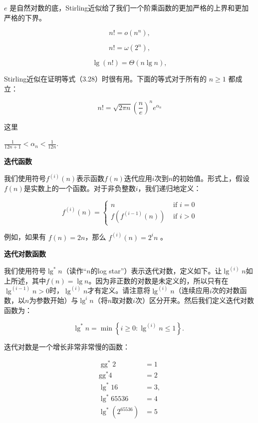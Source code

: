 \documentclass[lang=cn,newtx,10pt,scheme=chinese]{elegantbook}
\begin{document}
$e$ 是自然对数的底，Stirling近似给了我们一个阶乘函数的更加严格的上界和更加严格的下界。

\begin{equation}
n!=o\left(n^n\right),
\end{equation}

\begin{equation}
n!=\omega\left(2^n\right),
\end{equation}

\begin{equation}
\lg (n!)=\Theta(n \lg n),
\end{equation}

Stirling近似在证明等式（3.28）时很有用。下面的等式对于所有的 $n \geq 1$ 都成立：

\begin{equation}
n !=\sqrt{2 \pi n}\left(\frac{n}{e}\right)^n e^{\alpha_n}
\end{equation}

这里

$\frac{1}{12 n+1}<\alpha_n<\frac{1}{12 n}$.

\textbf{迭代函数}

我们使用符号$f^{(i)}(n)$表示函数$f(n)$迭代应用$i$次到$n$的初始值。形式上，假设$f(n)$是实数上的一个函数。对于非负整数$i$，我们递归地定义：

\begin{equation}
f^{(i)}(n)= \begin{cases}n & \text { if } i=0 \\ f\left(f^{(i-1)}(n)\right) & \text { if } i>0\end{cases}
\end{equation}

例如，如果有 $f(n)=2 n$，那么 $f^{(i)}(n)=2^i n$ 。

\textbf{迭代对数函数}

我们使用符号$\lg ^* n$（读作“$n$的log star”）表示迭代对数，定义如下。让$\lg ^{(i)} n$如上所述，其中$f(n)=\lg n$。因为非正数的对数是未定义的，所以只有在$\lg ^{(i-1)} n>0$时，$\lg ^{(i)} n$才有定义。请注意将$\lg ^{(i)} n$（连续应用$i$次的对数函数，以$n$为参数开始）与$\lg ^i n$（将$n$取对数$i$次）区分开来。然后我们定义迭代对数函数为：

$$
\lg ^* n=\min \left\{i \geq 0: \lg ^{(i)} n \leq 1\right\} \text {. }
$$

迭代对数是一个增长非常非常慢的函数：

$$
\begin{aligned}
\operatorname{gg}^* 2 & =1 \\
\mathrm{gg}^* 4 & =2 \\
\lg ^* 16 & =3, \\
\lg ^* 65536 & =4 \\
\lg ^*\left(2^{65536}\right) & =5
\end{aligned}
$$
\end{document}
